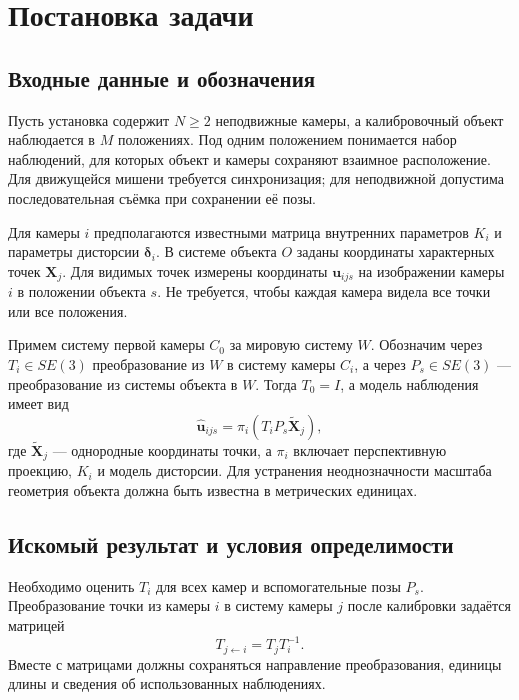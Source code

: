 \section{Постановка задачи}

\subsection{Входные данные и обозначения}

Пусть установка содержит $N\geq2$ неподвижные камеры, а калибровочный объект наблюдается в $M$ положениях. Под одним положением понимается набор наблюдений, для которых объект и камеры сохраняют взаимное расположение. Для движущейся мишени требуется синхронизация; для неподвижной допустима последовательная съёмка при сохранении её позы.

Для камеры $i$ предполагаются известными матрица внутренних параметров $K_i$ и параметры дисторсии $\boldsymbol\delta_i$. В системе объекта $O$ заданы координаты характерных точек $\mathbf X_j$. Для видимых точек измерены координаты $\mathbf u_{ijs}$ на изображении камеры $i$ в положении объекта $s$. Не требуется, чтобы каждая камера видела все точки или все положения.

Примем систему первой камеры $C_0$ за мировую систему $W$. Обозначим через $T_i\in SE(3)$ преобразование из $W$ в систему камеры $C_i$, а через $P_s\in SE(3)$ --- преобразование из системы объекта в $W$. Тогда $T_0=I$, а модель наблюдения имеет вид
\begin{equation}
  \widehat{\mathbf u}_{ijs}
  =\pi_i\!\left(T_iP_s\widetilde{\mathbf X}_j\right),
  \label{eq:projection}
\end{equation}
где $\widetilde{\mathbf X}_j$ --- однородные координаты точки, а $\pi_i$ включает перспективную проекцию, $K_i$ и модель дисторсии. Для устранения неоднозначности масштаба геометрия объекта должна быть известна в метрических единицах.

\subsection{Искомый результат и условия определимости}

Необходимо оценить $T_i$ для всех камер и вспомогательные позы $P_s$. Преобразование точки из камеры $i$ в систему камеры $j$ после калибровки задаётся матрицей
\begin{equation}
  T_{j\leftarrow i}=T_jT_i^{-1}.
  \label{eq:relative}
\end{equation}
Вместе с матрицами должны сохраняться направление преобразования, единицы длины и сведения об использованных наблюдениях.

